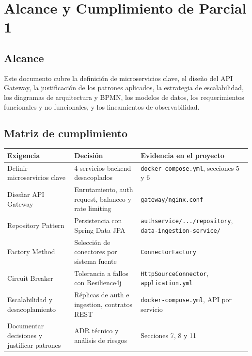 \documentclass[12pt,a4paper]{article}
\begin{document}
\section{Alcance y Cumplimiento de Parcial 1}

\subsection{Alcance}

Este documento cubre la definición de microservicios clave, el diseño del API Gateway, la justificación de los patrones aplicados, la estrategia de escalabilidad, los diagramas de arquitectura y BPMN, los modelos de datos, los requerimientos funcionales y no funcionales, y los lineamientos de observabilidad.

\newpage
\subsection{Matriz de cumplimiento}

\begin{longtable}{p{}p{}p{}}
\toprule
\textbf{Exigencia} & \textbf{Decisión} & \textbf{Evidencia en el proyecto} \\
\midrule
Definir microservicios clave & 4 servicios backend desacoplados & \texttt{docker-compose.yml}, secciones 5 y 6 \\
Diseñar API Gateway & Enrutamiento, auth request, balanceo y rate limiting & \texttt{gateway/nginx.conf} \\
Repository Pattern & Persistencia con Spring Data JPA & \texttt{authservice/.../repository}, 
\texttt{data-ingestion-service/} \\
Factory Method & Selección de conectores por sistema fuente & \texttt{ConnectorFactory} \\
Circuit Breaker & Tolerancia a fallos con Resilience4j & \texttt{HttpSourceConnector}, \texttt{application.yml} \\
Escalabilidad y desacoplamiento & Réplicas de auth e ingestion, contratos REST & \texttt{docker-compose.yml}, API por servicio \\
Documentar decisiones y justificar patrones & ADR técnico y análisis de riesgos & Secciones 7, 8 y 11 \\
\bottomrule
\end{longtable}
\end{document}
